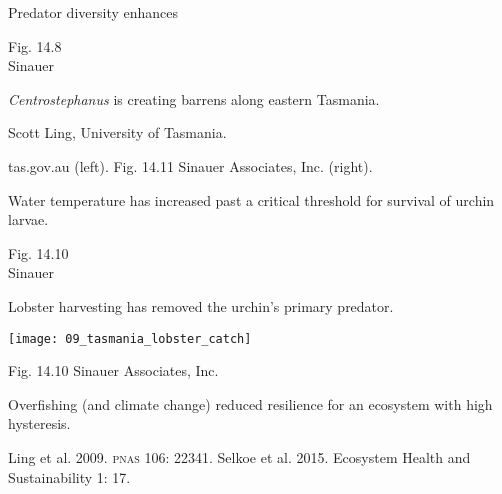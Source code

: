 \documentclass[t]{beamer}
\begin{document}
%
{
\begin{frame}[t]{Predator diversity enhances }

	\vfilll
	
	\tiny Fig. 14.8 \\ \textcopyright Sinauer
\end{frame}
}
%
{
\begin{frame}[t]{\textit{Centrostephanus} is creating barrens along eastern Tasmania.}

	\vfilll
	\hfill \tiny \colorbox{shadecolor}{\textcopyright Scott Ling, University of Tasmania.}
\end{frame}
}
%
{
\begin{frame}[b]

	\vfilll
	\tiny tas.gov.au (left). Fig. 14.11 \textcopyright Sinauer Associates, Inc. (right).
\end{frame}
}
%
{
\begin{frame}[b]{Water temperature has increased past a critical threshold for survival of urchin larvae.}

	\vfilll
	\hfill \tiny Fig. 14.10 \\ \hfill \textcopyright Sinauer
\end{frame}
}
%
\begin{frame}[t]{Lobster harvesting has removed the urchin's primary predator.}

	\texttt{[image: 09\_tasmania\_lobster\_catch]}
	
	\vfilll
	
	\hfill \tiny Fig. 14.10 \textcopyright Sinauer Associates, Inc.
\end{frame}
%
{
\begin{frame}[b]{Overfishing (and climate change) reduced resilience for an ecosystem with high hysteresis.}

	\tiny Ling et al. 2009. \textsc{pnas} 106: 22341. \hfill Selkoe et al. 2015. Ecosystem Health and Sustainability 1: 17.
\end{frame}
}
%
\end{document}
